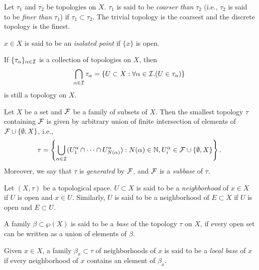 \documentclass{techreport}
\begin{document}
\begin{definition}
	Let $\tau_1$ and $\tau_2$ be topologies on $X$.
	$\tau_1$ is said to be \emph{coarser than} $\tau_2$ (i.e., $\tau_2$ is said to be \emph{finer than} $\tau_1$) if $\tau_1 \subset \tau_2$.
	The trivial topology is the coarsest and the discrete topology is the finest.
\end{definition}

\begin{definition}
	$x \in X$ is said to be an \emph{isolated point} if $\{x\}$ is open.
\end{definition}

\begin{remark}
	If $\{ \tau_\alpha \}_{\alpha \in \mathcal{I}}$ is a collection of topologies on $X$, then
	\[
	\bigcap_{\alpha \in \mathcal{I}} \tau_\alpha = \{ U \subset X : \forall \alpha \in \mathcal{I}. (U \in \tau_\alpha) \}
	\]
	is still a topology on $X$.
\end{remark}

\begin{proposition}
	Let $X$ be a set and $\mathcal{F}$ be a family of subsets of $X$.
	Then the smallest topology $\tau$ containing $\mathcal{F}$ is given by arbitrary union of finite intersection of elements of $\mathcal{F} \cup \{\emptyset,X\}$, i.e.,
	\[
	\tau = \left\{ \bigcup_{\alpha \in \mathcal{I}} (U_1^\alpha \cap \cdots \cap U_{N(\alpha)}^\alpha) : N(\alpha) \in \mathbb{N}, U_i^\alpha \in \mathcal{F} \cup \{ \emptyset, X \} \right\}.
	\]
	Moreover, we say that $\tau$ is \emph{generated} by $\mathcal{F}$, and $\mathcal{F}$ is a \emph{subbase} of $\tau$.
\end{proposition}

\begin{definition}
	Let $(X,\tau)$ be a topological space.
	$U \subset X$ is said to be a \emph{neighborhood} of $x \in X$ if $U$ is open and $x \in U$.
	Similarly, $U$ is said to be a neighborhood of $E \subset X$ if $U$ is open and $E \subset U$.
\end{definition}

\begin{definition}
	A family $\beta \subset \wp(X)$ is said to be a \emph{base} of the topology $\tau$ on $X$, if every open set can be written as a union of elements of $\beta$.
	
	Given $x \in X$, a family $\beta_x \subset \tau$ of neighborhoods of $x$ is said to be a \emph{local base} of $x$ if every neighborhood of $x$ contains an element of $\beta_x$.
\end{definition}
\end{document}
